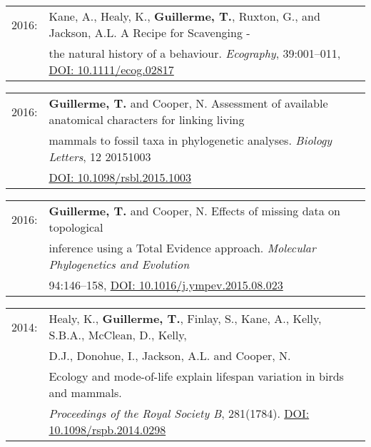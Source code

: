 \documentclass[10pt,a4paper]{article}
\begin{document}
{\bigskip

\begin{tabular}{ll}
2016: & Kane, A., Healy, K., \textbf{Guillerme, T.}, Ruxton, G., and Jackson, A.L. A Recipe for Scavenging -\\
& the natural history of a behaviour. \textit{Ecography}, 39:001–011, \href{http://onlinelibrary.wiley.com/doi/10.1111/ecog.02817/abstract}{DOI: 10.1111/ecog.02817}\\ %
\end{tabular}

\bigskip

\begin{tabular}{ll}
2016: &\textbf{Guillerme, T.} and Cooper, N. Assessment of available anatomical characters for linking living\\
& mammals to fossil taxa in phylogenetic analyses. \textit{Biology Letters}, 12 20151003\\
& \href{http://rsbl.royalsocietypublishing.org/content/12/5/20151003}{DOI: 10.1098/rsbl.2015.1003}\\ %
\end{tabular}

\bigskip

\begin{tabular}{ll}
2016: & \textbf{Guillerme, T.} and Cooper, N. Effects of missing data on topological\\
& inference using a Total Evidence approach. \textit{Molecular Phylogenetics and Evolution}\\
&  94:146–158, \href{http://goo.gl/bVGrQJ}{DOI: 10.1016/j.ympev.2015.08.023}\\
\end{tabular}

\bigskip

\begin{tabular}{ll}
2014: & Healy, K., \textbf{Guillerme, T.}, Finlay, S., Kane, A., Kelly, S.B.A., McClean, D., Kelly, \\
& D.J., Donohue, I., Jackson, A.L. and Cooper, N. \\
& Ecology and mode-of-life explain lifespan variation in birds and mammals.\\
& \textit{Proceedings of the Royal Society B}, 281(1784). \href{http://rspb.royalsocietypublishing.org/content/281/1784/20140298}{DOI: 10.1098/rspb.2014.0298}\\ %
\end{tabular}

\bigskip

}
\end{document}
